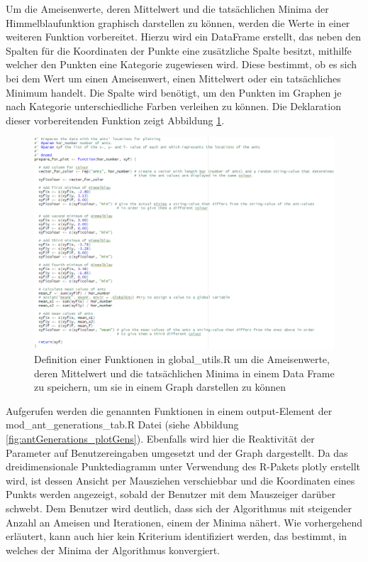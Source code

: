 Um die Ameisenwerte, deren Mittelwert und die tatsächlichen Minima der Himmelblaufunktion graphisch darstellen zu können, werden die Werte in einer weiteren Funktion vorbereitet. Hierzu wird ein DataFrame erstellt, das neben den Spalten für die Koordinaten der Punkte eine zusätzliche Spalte besitzt, mithilfe welcher den Punkten eine Kategorie zugewiesen wird. Diese bestimmt, ob es sich bei dem Wert um einen Ameisenwert, einen Mittelwert oder ein tatsächliches Minimum handelt. Die Spalte wird benötigt, um den Punkten im Graphen je nach Kategorie unterschiedliche Farben verleihen zu können.
Die Deklaration dieser vorbereitenden Funktion zeigt Abbildung \ref{fig:util_prepareForPlot}.


\begin{figure}[H]
 \centering
 \includegraphics[scale=0.6]{"images/04_Visualisierung_des_Algorithmus/util_prepareForPlot.png"}
 \caption{Definition einer Funktionen in global\_utils.R um die Ameisenwerte, deren Mittelwert und die tatsächlichen Minima in einem Data Frame zu speichern, um sie in einem Graph darstellen zu können}
 \label{fig:util_prepareForPlot}
\end{figure}

Aufgerufen werden die genannten Funktionen in einem output-Element der \linebreak mod\_ant\_generations\_tab.R Datei (siehe Abbildung \ref{fig:antGenerations_plotGens}). Ebenfalls wird hier die Reaktivität der Parameter auf Benutzereingaben umgesetzt und der Graph dargestellt. 
Da das dreidimensionale Punktediagramm unter Verwendung des R-Pakets plotly erstellt wird, ist dessen Ansicht per Mausziehen verschiebbar und die Koordinaten eines Punkts werden angezeigt, sobald der Benutzer mit dem Mauszeiger darüber schwebt.
Dem Benutzer wird deutlich, dass sich der Algorithmus mit steigender Anzahl an Ameisen und Iterationen, einem der Minima nähert.  Wie vorhergehend erläutert, kann auch hier kein Kriterium identifiziert werden, das bestimmt, in welches der Minima der Algorithmus konvergiert.


